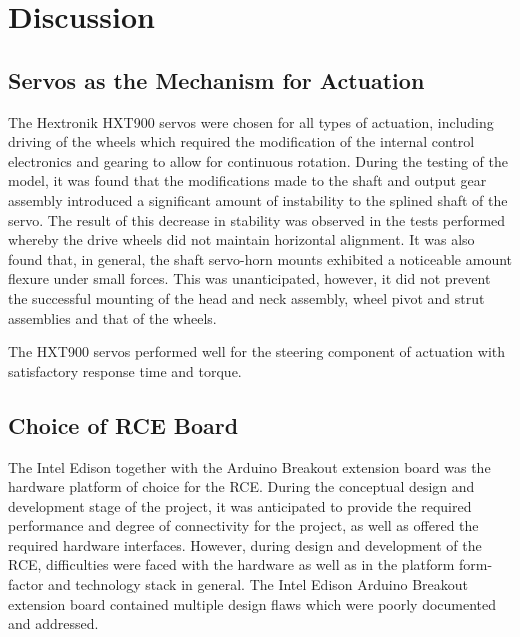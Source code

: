 \section{Discussion}
  \subsection{Servos as the Mechanism for Actuation}
    \label{subsec:rec-servoSuitability}
    The Hextronik HXT900 servos were chosen for all types of actuation, including driving of the wheels which required the modification of the internal control electronics and gearing to allow for continuous rotation. During the testing of the model, it was found that the modifications made to the shaft and output gear assembly introduced a significant amount of instability to the splined shaft of the servo. The result of this decrease in stability was observed in the tests performed whereby the drive wheels did not maintain horizontal alignment. It was also found that, in general, the shaft servo-horn mounts exhibited a noticeable amount flexure under small forces. This was unanticipated, however, it did not prevent the successful mounting of the head and neck assembly, wheel pivot and strut assemblies and that of the wheels.
    
    The HXT900 servos performed well for the steering component of actuation with satisfactory response time and torque.
  
  \subsection{Choice of RCE Board}
    \label{subsec:rec-choiceOfRCEBoard}
    The Intel Edison together with the Arduino Breakout extension board was the hardware platform of choice for the RCE. During the conceptual design and development stage of the project, it was anticipated to provide the required performance and degree of connectivity for the project, as well as offered the required hardware interfaces. However, during design and development of the RCE, difficulties were faced with the hardware as well as in the platform form-factor and technology stack in general. The Intel Edison Arduino Breakout extension board contained multiple design flaws which were poorly documented and addressed.
    
